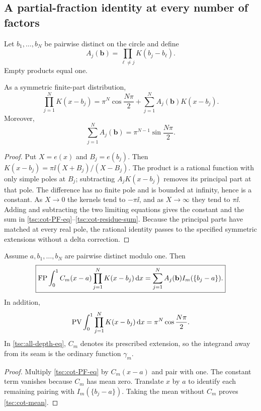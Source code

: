 \subsection{A partial-fraction identity at every number of factors}
Let $b_1,\ldots,b_N$ be pairwise distinct on the circle and define
\begin{equation}\label{tsc:Acot}
 A_j(\mathbf b)=\prod_{\ell\ne j}K(b_j-b_\ell).
\end{equation}
Empty products equal one.
\begin{lemma}\label{tsc:cot-PF}
As a symmetric finite-part distribution,
\begin{equation}\label{tsc:cot-PF-eq}
 \prod_{j=1}^N K(x-b_j)
     =\pi^N\cos\frac{N\pi}{2}
        +\sum_{j=1}^NA_j(\mathbf b)K(x-b_j).
\end{equation}
Moreover,
\begin{equation}\label{tsc:cot-residue-sum}
 \sum_{j=1}^NA_j(\mathbf b)=\pi^{N-1}\sin\frac{N\pi}{2}.
\end{equation}
\end{lemma}
\begin{proof}
Put $X=e(x)$ and $B_j=e(b_j)$. Then
$K(x-b_j)=\pi\ii(X+B_j)/(X-B_j)$.
The product is a rational function with only simple poles at $B_j$;
subtracting $A_jK(x-b_j)$ removes its principal part at that pole.
The difference has no finite pole and is bounded at infinity, hence is a
constant. As $X\to0$ the kernels tend to $-\pi\ii$, and as $X\to\infty$
they tend to $\pi\ii$. Adding and subtracting the two limiting equations
gives the constant and the sum in \eqref{tsc:cot-PF-eq}--\eqref{tsc:cot-residue-sum}.
Because the principal parts have matched at every real pole, the rational
identity passes to the specified symmetric extensions without a delta
correction.
\end{proof}

\begin{theorem}\label{tsc:all-depth}
Assume $a,b_1,\ldots,b_N$ are pairwise distinct modulo one. Then
\begin{equation}\label{tsc:all-depth-eq}
 \boxed{\displaystyle
 \operatorname{FP}\int_0^1 C_m(x-a)\prod_{j=1}^NK(x-b_j)\,\mathrm d x
       =\sum_{j=1}^NA_j(\mathbf b)I_m(\{b_j-a\}).}
\end{equation}
In addition,
\begin{equation}\label{tsc:cot-mean}
 \operatorname{PV}\int_0^1\prod_{j=1}^NK(x-b_j)\,\mathrm d x
                 =\pi^N\cos\frac{N\pi}{2}.
\end{equation}
In \eqref{tsc:all-depth-eq}, $C_m$ denotes its prescribed extension, so the
integrand away from its seam is the ordinary function $\gamma_m$.
\end{theorem}
\begin{proof}
Multiply \eqref{tsc:cot-PF-eq} by $C_m(x-a)$ and pair with one. The
constant term vanishes because $C_m$ has mean zero. Translate $x$ by $a$
to identify each remaining pairing with $I_m(\{b_j-a\})$. Taking the
mean without $C_m$ proves \eqref{tsc:cot-mean}.
\end{proof}

